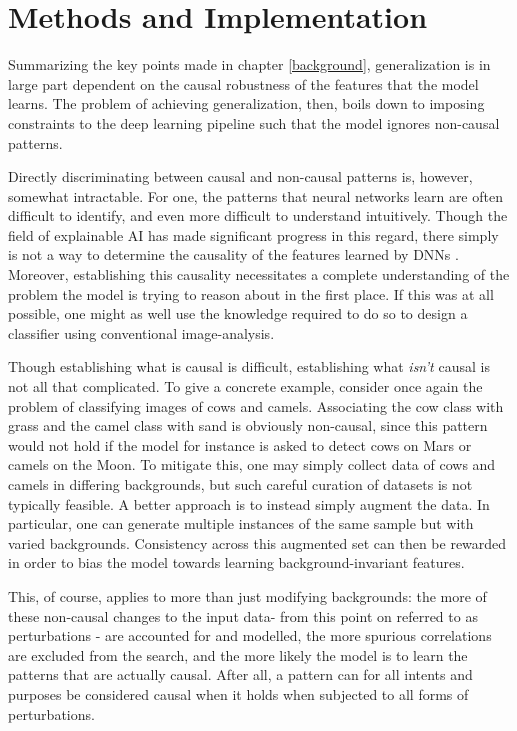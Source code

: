 \chapter{Methods and Implementation}
\setcounter{chapter}{3}
Summarizing the key points made in chapter \ref{background}, generalization is in large part dependent on the causal robustness of the features that the model learns. The problem of achieving generalization, then, boils down to imposing constraints to the deep learning pipeline such that the model ignores non-causal patterns.

Directly discriminating between causal and non-causal patterns is, however, somewhat intractable. For one, the patterns that neural networks learn are often difficult to identify, and even more difficult to understand intuitively. Though the field of explainable AI has made significant progress in this regard, there simply is not a way to determine the causality of the features learned by DNNs . Moreover, establishing  this causality necessitates a complete understanding of the problem the model is trying to reason about in the first place. If this was at all possible, one might as well use the knowledge required to do so to design a classifier using conventional image-analysis. 

Though establishing what is causal is difficult, establishing what \textit{isn't} causal is not all that complicated. To give a concrete example, consider once again the problem of classifying images of cows and camels. Associating the cow class with grass and the camel class with sand is obviously non-causal, since this pattern would not hold if the model for instance is asked to detect cows on Mars or camels on the Moon. To mitigate this, one may simply collect data of cows and camels in differing backgrounds, but such careful curation of datasets is not typically feasible. A better approach is to instead simply augment the data. In particular, one can generate multiple instances of the same sample but with varied backgrounds. Consistency across this augmented set can then be rewarded in order to bias the model towards learning background-invariant features. 

This, of course, applies to more than just modifying backgrounds: the more of these non-causal changes to the input data-  from this point on referred to as perturbations - are accounted for and modelled, the more spurious correlations are excluded from the search, and the more likely the model is to learn the patterns that are actually causal. After all, a pattern can for all intents and purposes be considered causal when it holds when subjected to all forms of perturbations. 

